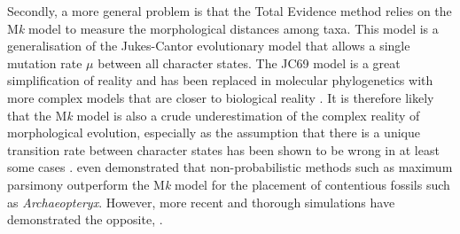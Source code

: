 Secondly, a more general problem is that the Total Evidence method relies on the M\textit{k} model \citep{lewisa2001} to measure the morphological distances among taxa.
This model is a generalisation of the Jukes-Cantor evolutionary model \citep[JC69;][]{jukes1969evolution} that allows a single mutation rate $\mu$ between all character states.
The JC69 model is a great simplification of reality and has been replaced in molecular phylogenetics with more complex models that are closer to biological reality \citep[e.g. the GTR model that allows a different rate for each different type of nucleotide change;][]{tavare1986}.
It is therefore likely that the M\textit{k} model is also a crude underestimation of the complex reality of morphological evolution, especially as the assumption that there is a unique transition rate between character states has been shown to be wrong in at least some cases \citep[e.g. for Dollo traits that are irreversible;][]{WrightDollo}.
\cite{spencerefficacy2013} even demonstrated that non-probabilistic methods such as maximum parsimony outperform the M\textit{k} model for the placement of contentious fossils such as \textit{Archaeopteryx}.
However, more recent and thorough simulations have demonstrated the opposite, %
\citep{wrightbayesian2014}.  

